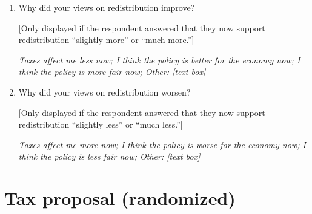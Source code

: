 \documentclass[11pt, headsepline]{article}
\begin{document}
\begin{enumerate}[resume]
    \item Why did your views on redistribution improve? 
    
    [Only displayed if the respondent answered that they now support redistribution ``slightly more'' or ``much more.'']

    \textit{Taxes affect me less now; I think the policy is better for the economy now; I think the policy is more fair now; Other: [text box]}

    \item Why did your views on redistribution worsen? 
    
    [Only displayed if the respondent answered that they now support redistribution ``slightly less'' or ``much less.'']

    \textit{Taxes affect me more now; I think the policy is worse for the economy now; I think the policy is less fair now; Other: [text box]}


    
\end{enumerate}


\section*{Tax proposal (randomized)}
\end{document}
